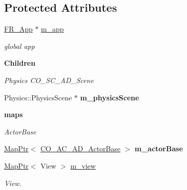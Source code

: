 \subsection*{Protected Attributes}
\begin{DoxyCompactItemize}
\item 
\hypertarget{classContent_1_1CO__SC__AD__Scene_a56fe3bef29d89e85d63088919f1126c6}{
\hyperlink{classFramework_1_1App}{FR\_\-App} $\ast$ \hyperlink{classContent_1_1CO__SC__AD__Scene_a56fe3bef29d89e85d63088919f1126c6}{m\_\-app}}
\label{classContent_1_1CO__SC__AD__Scene_a56fe3bef29d89e85d63088919f1126c6}

\begin{DoxyCompactList}\small\item\em global app \item\end{DoxyCompactList}\end{DoxyCompactItemize}
\begin{Indent}{\bf Children}\par
{\em \label{_amgrp64e4aca4297806247f62a7b5f8cbd3df}
 Physics CO\_\-SC\_\-AD\_\-Scene }\begin{DoxyCompactItemize}
\item 
\hypertarget{classContent_1_1CO__SC__AD__Scene_a77a816ed4aefa005179a92908708f227}{
Physics::PhysicsScene $\ast$ {\bfseries m\_\-physicsScene}}
\label{classContent_1_1CO__SC__AD__Scene_a77a816ed4aefa005179a92908708f227}

\end{DoxyCompactItemize}
\end{Indent}
\begin{Indent}{\bf maps}\par
{\em \label{_amgrp7e94476d62556cc8501e3df5b8d6470d}
 ActorBase }\begin{DoxyCompactItemize}
\item 
\hypertarget{classContent_1_1CO__SC__AD__Scene_af6d22b42bb0e946596ff1cbfe5bc9511}{
\hyperlink{classMapPtr}{MapPtr}$<$ \hyperlink{classContent_1_1Actor_1_1Admin_1_1ActorBase}{CO\_\-AC\_\-AD\_\-ActorBase} $>$ {\bfseries m\_\-actorBase}}
\label{classContent_1_1CO__SC__AD__Scene_af6d22b42bb0e946596ff1cbfe5bc9511}

\item 
\hypertarget{classContent_1_1CO__SC__AD__Scene_a60aaad482eed27853403a7a845d8ff00}{
\hyperlink{classMapPtr}{MapPtr}$<$ View $>$ \hyperlink{classContent_1_1CO__SC__AD__Scene_a60aaad482eed27853403a7a845d8ff00}{m\_\-view}}
\label{classContent_1_1CO__SC__AD__Scene_a60aaad482eed27853403a7a845d8ff00}

\begin{DoxyCompactList}\small\item\em View. \item\end{DoxyCompactList}\end{DoxyCompactItemize}
\end{Indent}
